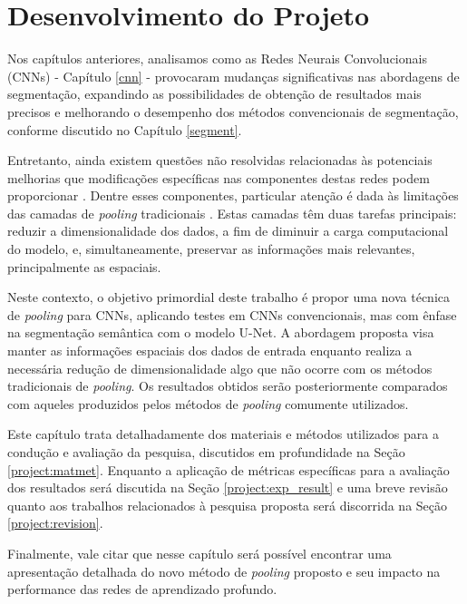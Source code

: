 \newpage
\clearpage

\section{Desenvolvimento do Projeto}
\label{project}

Nos capítulos anteriores, analisamos como as Redes Neurais Convolucionais (CNNs) - Capítulo \ref{cnn} - provocaram mudanças significativas nas abordagens de segmentação, expandindo as possibilidades de obtenção de resultados mais precisos e melhorando o desempenho dos métodos convencionais de segmentação, conforme discutido no Capítulo \ref{segment}.

Entretanto, ainda existem questões não resolvidas relacionadas às potenciais melhorias que modificações específicas nas componentes destas redes podem proporcionar \citep{AsgariTaghanaki2021DeepReview}. Dentre esses componentes, particular atenção é dada às limitações das camadas de \textit{pooling} tradicionais \citep{Liu2019Multi-LevelNetworks, He2015SpatialRecognition}. Estas camadas têm duas tarefas principais: reduzir a dimensionalidade dos dados, a fim de diminuir a carga computacional do modelo, e, simultaneamente, preservar as informações mais relevantes, principalmente as espaciais.

Neste contexto, o objetivo primordial deste trabalho é propor uma nova técnica de \textit{pooling} para CNNs, aplicando testes em CNNs convencionais, mas com ênfase na segmentação semântica com o modelo U-Net. A abordagem proposta visa manter as informações espaciais dos dados de entrada enquanto realiza a necessária redução de dimensionalidade algo que não ocorre com os métodos tradicionais de \textit{pooling}. Os resultados obtidos serão posteriormente comparados com aqueles produzidos pelos métodos de \textit{pooling} comumente utilizados.

Este capítulo trata detalhadamente dos materiais e métodos utilizados para a condução e avaliação da pesquisa, discutidos em profundidade na Seção \ref{project:matmet}. Enquanto a aplicação de métricas específicas para a avaliação dos resultados será discutida na Seção \ref{project:exp_result} e uma breve revisão quanto aos trabalhos relacionados à pesquisa proposta será discorrida na Seção \ref{project:revision}.

Finalmente, vale citar que nesse capítulo será possível encontrar uma apresentação detalhada do novo método de \textit{pooling} proposto e seu impacto na performance das redes de aprendizado profundo.


